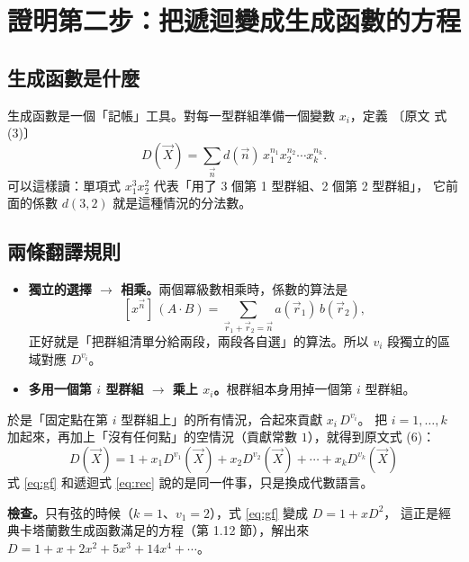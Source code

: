 \documentclass[11pt,a4paper]{article}
\newcommand{\vn}{\vec n}
\newcommand{\vr}{\vec r}
\newcommand{\vX}{\vec X}
\newcommand{\paper}[1]{{\small\color{gray!70!black}〔原文 #1〕}}
\begin{document}
\section{證明第二步：把遞迴變成生成函數的方程}

\subsection{生成函數是什麼}

生成函數是一個「記帳」工具。對每一型群組準備一個變數 $x_i$，定義 \paper{式 (3)}
\[
D(\vX)=\sum_{\vn} d(\vn)\,x_1^{n_1}x_2^{n_2}\cdots x_k^{n_k}.
\]
可以這樣讀：單項式 $x_1^{3}x_2^{2}$ 代表「用了 3 個第 1 型群組、2 個第 2 型群組」，
它前面的係數 $d(3,2)$ 就是這種情況的分法數。

\subsection{兩條翻譯規則}

\begin{keybox}[組合 $\longleftrightarrow$ 代數]
\begin{itemize}[leftmargin=1.4em]
  \item \textbf{獨立的選擇 $\to$ 相乘。}兩個冪級數相乘時，係數的算法是
        \[[x^{\vn}]\,(A\cdot B)=\sum_{\vr_1+\vr_2=\vn}a(\vr_1)\,b(\vr_2),\]
        正好就是「把群組清單分給兩段，兩段各自選」的算法。所以 $v_i$ 段獨立的區域對應 $D^{v_i}$。
  \item \textbf{多用一個第 $i$ 型群組 $\to$ 乘上 $x_i$。}根群組本身用掉一個第 $i$ 型群組。
\end{itemize}
\end{keybox}

於是「固定點在第 $i$ 型群組上」的所有情況，合起來貢獻 $x_i\,D^{v_i}$。
把 $i=1,\ldots,k$ 加起來，再加上「沒有任何點」的空情況（貢獻常數 $1$），就得到原文式 (6)：
\begin{equation}\label{eq:gf}
\boxed{\;D(\vX)=1+x_1D^{v_1}(\vX)+x_2D^{v_2}(\vX)+\cdots+x_kD^{v_k}(\vX)\;}
\end{equation}
式 \eqref{eq:gf} 和遞迴式 \eqref{eq:rec} 說的是同一件事，只是換成代數語言。

\textbf{檢查。}只有弦的時候（$k=1$、$v_1=2$），式 \eqref{eq:gf} 變成 $D=1+xD^2$，
這正是經典卡塔蘭數生成函數滿足的方程（第 1.12 節），解出來 $D=1+x+2x^2+5x^3+14x^4+\cdots$。

\end{document}
